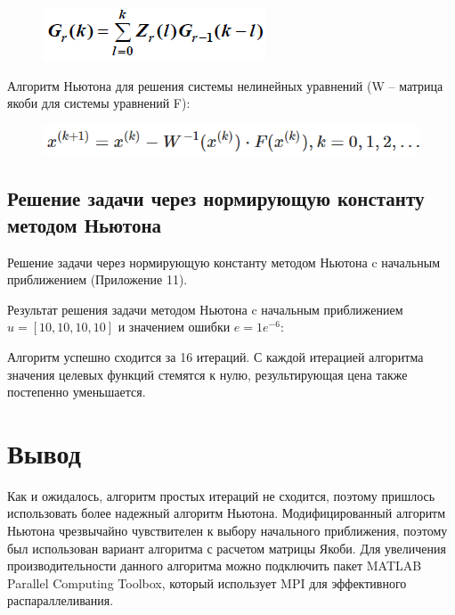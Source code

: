 \begin{figure}[h!]
	\centering
	\includegraphics[scale = 0.79]{images/p3_5_5.png}
	\label{image:p3_5_5}
\end{figure}

Алгоритм Ньютона для решения системы нелинейных уравнений (W -- матрица якоби для системы уравнений F):

\begin{figure}[h!]
	\centering
	\includegraphics[scale = 0.70]{images/p3_6_1.png}
	\label{image:p3_6_1}
\end{figure}

\subsection{Решение задачи через нормирующую константу методом Ньютона}

Решение задачи через нормирующую константу методом Ньютона c начальным приближением (Приложение 11).

Результат решения задачи методом Ньютона c начальным приближением $u=[10, 10, 10, 10]$ и значением ошибки $e=1e^{-6}$:



Алгоритм успешно сходится за 16 итераций. С каждой итерацией алгоритма значения целевых функций стемятся к нулю, результирующая цена также постепенно уменьшается.

\section{Вывод}

Как и ожидалось, алгоритм простых итераций не сходится, поэтому пришлось использовать более надежный алгоритм Ньютона. Модифицированный алгоритм Ньютона чрезвычайно чувствителен к выбору начального приближения, поэтому был использован вариант алгоритма с расчетом матрицы Якоби. Для увеличения производительности данного алгоритма можно подключить пакет MATLAB Parallel Computing Toolbox, который использует MPI для эффективного распараллеливания. 